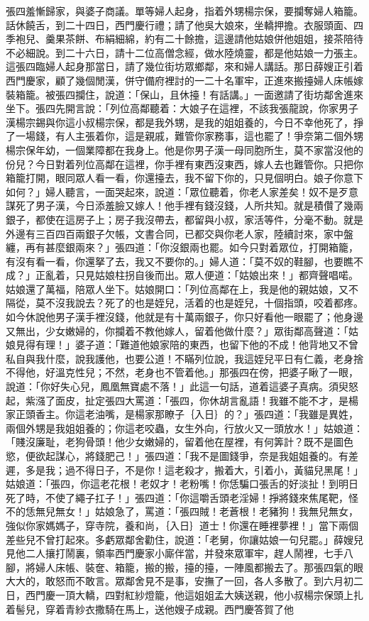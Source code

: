 張四羞慚歸家，與婆子商議。單等婦人起身，指着外甥楊宗保，要攔奪婦人箱籠。話休饒舌，到二十四日，西門慶行禮；請了他吳大娘來，坐轎押擔。衣服頭面、四季袍兒、羹果茶餅、布絹細綿，約有二十餘擔，這邊請他姑娘併他姐姐，接茶陪待不必細說。到二十六日，請十二位高僧念經，做水陸燒靈，都是他姑娘一力張主。這張四臨婦人起身那當日，請了幾位街坊眾鄉鄰，來和婦人講話。那日薛嫂正引着西門慶家，顧了幾個閒漢，併守備府裡討的一二十名軍牢，正進來搬擡婦人床帳嫁裝箱籠。被張四攔住，說道：「保山，且休擡！有話講。」一面邀請了街坊鄰舍進來坐下。張四先開言說：「列位高鄰聽着：大娘子在這裡，不該我張龍說，你家男子漢楊宗錫與你這小叔楊宗保，都是我外甥，是我的姐姐養的，今日不幸他死了，掙了一場錢，有人主張着你，這是親戚，難管你家務事，這也罷了！爭奈第二個外甥楊宗保年幼，一個業障都在我身上。他是你男子漢一母同胞所生，莫不家當沒他的份兒？今日對着列位高鄰在這裡，你手裡有東西沒東西，嫁人去也難管你。只把你箱籠打開，眼同眾人看一看，你還擡去，我不留下你的，只見個明白。娘子你意下如何？」婦人聽言，一面哭起來，說道：「眾位聽着，你老人家差矣！奴不是歹意謀死了男子漢，今日添羞臉又嫁人！他手裡有錢沒錢，人所共知。就是積儹了幾兩銀子，都使在這房子上；房子我沒帶去，都留與小叔，家活等件，分毫不動。就是外邊有三百四百兩銀子欠帳，文書合同，已都交與你老人家，陸續討來，家中盤纏，再有甚麼銀兩來？」張四道：「你沒銀兩也罷。如今只對着眾位，打開箱籠，有沒有看一看，你還拏了去，我又不要你的。」婦人道：「莫不奴的鞋腳，也要瞧不成？」正亂着，只見姑娘柱拐自後而出。眾人便道：「姑娘出來！」都齊聲唱喏。姑娘還了萬福，陪眾人坐下。姑娘開口：「列位高鄰在上，我是他的親姑娘，又不隔從，莫不沒我說去？死了的也是姪兒，活着的也是姪兒，十個指頭，咬着都疼。如今休說他男子漢手裡沒錢，他就是有十萬兩銀子，你只好看他一眼罷了；他身邊又無出，少女嫩婦的，你攔着不教他嫁人，留着他做什麼？」眾街鄰高聲道：「姑娘見得有理！」婆子道：「難道他娘家陪的東西，也留下他的不成！他背地又不曾私自與我什麼，說我護他，也要公道！不瞞列位說，我這姪兒平日有仁義，老身捨不得他，好溫克性兒；不然，老身也不管着他。」那張四在傍，把婆子瞅了一眼，說道：「你好失心兒，鳳凰無寶處不落！」此這一句話，道着這婆子真病。須臾怒起，紫漒了面皮，扯定張四大罵道：「張四，你休胡言亂語！我雖不能不才，是楊家正頭香主。你這老油嘴，是楊家那瞭子｛入日｝的？」張四道：「我雖是異姓，兩個外甥是我姐姐養的；你這老咬蟲，女生外向，行放火又一頭放水！」姑娘道：「賤沒廉耻，老狗骨頭！他少女嫩婦的，留着他在屋裡，有何筭計？既不是圖色慾，便欲起謀心，將錢肥己！」張四道：「我不是圖錢爭，奈是我姐姐養的。有差遲，多是我；過不得日子，不是你！這老殺才，搬着大，引着小，黃貓兒黑尾！」姑娘道：「張四，你這老花根！老奴才！老粉嘴！你恁騙口張舌的好淡扯！到明日死了時，不使了繩子扛子！」張四道：「你這嚼舌頭老淫婦！掙將錢來焦尾靶，怪不的恁無兒無女！」姑娘急了，罵道：「張四賊！老蒼根！老豬狗！我無兒無女，強似你家媽媽子，穿寺院，養和尚，｛入日｝道士！你還在睡裡夢裡！」當下兩個差些兒不曾打起來。多虧眾鄰舍勸住，說道：「老舅，你讓姑娘一句兒罷。」薛嫂兒見他二人攘打鬧裏，領率西門慶家小廝伴當，并發來眾軍牢，趕人鬧裡，七手八腳，將婦人床帳、裝奩、箱籠，搬的搬，擡的擡，一陣風都搬去了。那張四氣的眼大大的，敢怒而不敢言。眾鄰舍見不是事，安撫了一回，各人多散了。到六月初二日，西門慶一頂大轎，四對紅紗燈籠，他這姐姐孟大姨送親，他小叔楊宗保頭上扎着髻兒，穿着青紗衣撒騎在馬上，送他嫂子成親。西門慶答賀了他